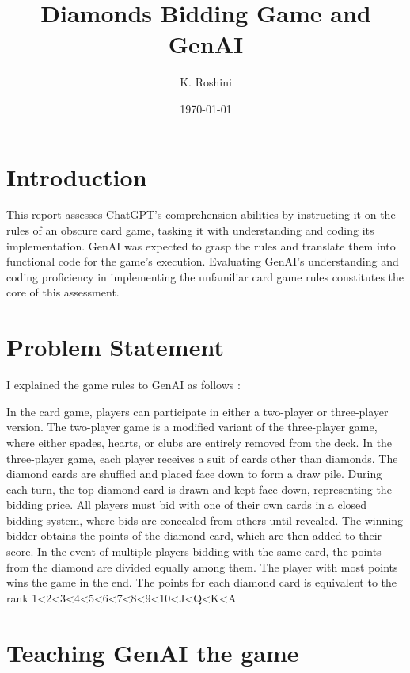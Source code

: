 \documentclass[a4paper]{article}
\title{Diamonds Bidding Game and GenAI}
\author{K. Roshini}
\date{\today}
\begin{document}
\maketitle


\section{Introduction}

This report assesses ChatGPT's comprehension abilities by instructing it on the rules of an obscure card game, tasking it with understanding and coding its implementation. GenAI was expected to grasp the rules and translate them into functional code for the game's execution. Evaluating GenAI's understanding and coding proficiency in implementing the unfamiliar card game rules constitutes the core of this assessment.

\section{Problem Statement}
I explained the game rules to GenAI as follows :


In the card game, players can participate in either a two-player or three-player version. The
two-player game is a modified variant of the three-player game, where either spades, hearts,
or clubs are entirely removed from the deck. In the three-player game, each player receives
a suit of cards other than diamonds. The diamond cards are shuffled and placed face down
to form a draw pile. During each turn, the top diamond card is drawn and kept face down,
representing the bidding price.
All players must bid with one of their own cards in a closed bidding system, where bids are
concealed from others until revealed. The winning bidder obtains the points of the diamond
card, which are then added to their score. In the event of multiple players bidding with the
same card, the points from the diamond are divided equally among them. The player with
most points wins the game in the end. The points for each diamond card is equivalent to the
rank 1<2<3<4<5<6<7<8<9<10<J<Q<K<A

\section{Teaching GenAI the game}
\end{document}
